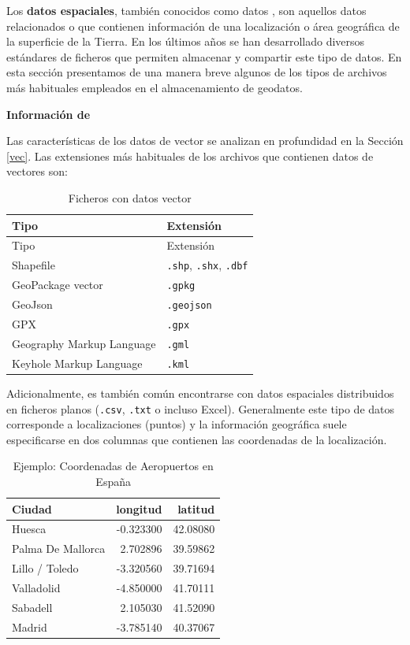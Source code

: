 \documentclass[
]{book}
\theoremstyle{definition}
\theoremstyle{definition}
\theoremstyle{definition}
\theoremstyle{definition}
\theoremstyle{remark}
\begin{document}
Los \textbf{datos espaciales}, también conocidos como datos \textbf{}, son
aquellos datos relacionados o que contienen información de una localización o
área geográfica de la superficie de la Tierra. En los últimos años se han
desarrollado diversos estándares de ficheros que permiten almacenar y compartir
este tipo de datos. En esta sección presentamos de una manera breve algunos de
los tipos de archivos más habituales empleados en el almacenamiento de geodatos.

\textbf{Información de }

Las características de los datos de vector se analizan en profundidad en la
Sección \ref{vec}. Las extensiones más habituales de los archivos que contienen
datos de vectores son:

\begin{longtable}[]{@{}ll@{}}
\caption{Ficheros con datos vector}\tabularnewline
\toprule
Tipo & Extensión \\
\midrule
\endfirsthead
\toprule
Tipo & Extensión \\
\midrule
\endhead
Shapefile & \texttt{.shp}, \texttt{.shx}, \texttt{.dbf} \\
GeoPackage vector & \texttt{.gpkg} \\
GeoJson & \texttt{.geojson} \\
GPX & \texttt{.gpx} \\
Geography Markup Language & \texttt{.gml} \\
Keyhole Markup Language & \texttt{.kml} \\
\bottomrule
\end{longtable}

Adicionalmente, es también común encontrarse con datos espaciales distribuidos
en ficheros planos (\texttt{.csv}, \texttt{.txt} o incluso Excel). Generalmente este tipo de
datos corresponde a localizaciones (puntos) y la información geográfica suele
especificarse en dos columnas que contienen las coordenadas de la localización.

\begin{table}

\caption{\label{tab:unnamed-chunk-7}Ejemplo: Coordenadas de Aeropuertos en España}
\centering
\begin{tabular}[t]{l|r|r}
\hline
Ciudad & longitud & latitud\\
\hline
Huesca & -0.323300 & 42.08080\\
\hline
Palma De Mallorca & 2.702896 & 39.59862\\
\hline
Lillo / Toledo & -3.320560 & 39.71694\\
\hline
Valladolid & -4.850000 & 41.70111\\
\hline
Sabadell & 2.105030 & 41.52090\\
\hline
Madrid & -3.785140 & 40.37067\\
\hline
\end{tabular}
\end{table}
\end{document}

